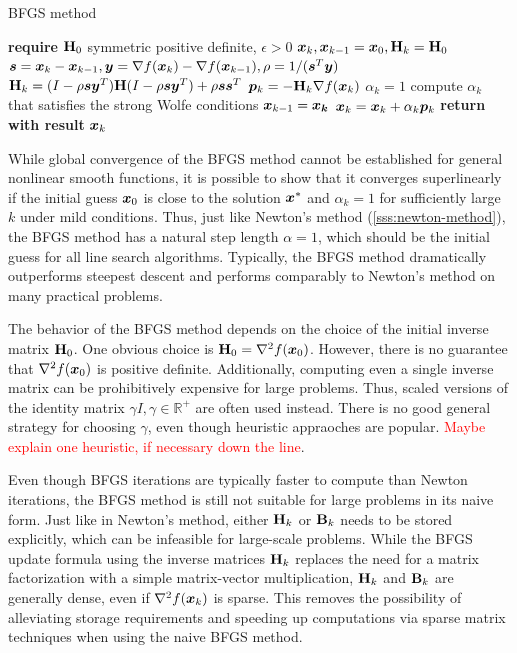 \begin{algorithm}
\caption{BFGS method}\label{alg:bfgs}
\begin{algorithmic}
\State \textbf{require } $\mathbf{H}_0$ symmetric positive definite, $\epsilon > 0$
\State $\bm{x}_k, \bm{x}_{k-1} = \bm{x}_0, \mathbf{H}_k = \mathbf{H}_0 $
\State $\bm{s} = \bm{x}_k - \bm{x}_{k-1}, \bm{y} = \nabla f(\bm{x}_k) - \nabla f(\bm{x}_{k-1}), \rho = 1 / (\bm{s}^T \bm{y})$
\State $\mathbf{H}_k = (I - \rho \bm{s} \bm{y}^T) \mathbf{H}(I - \rho \bm{s} \bm{y}^T) + \rho\bm{s}\bm{s}^T$
\State $\bm{p}_k = -\mathbf{H}_k \nabla f(\bm{x}_k)$
\State $\alpha_k = 1$
\State compute $\alpha_k$ that satisfies the strong Wolfe conditions
\EndIf
\State $\bm{x}_{k-1} = \bm{x_k}$
\State $\bm{x}_k = \bm{x}_k + \alpha_k \bm{p}_k$
\EndWhile
\State \textbf{return with result } $\bm{x}_k$
\EndProcedure
\end{algorithmic}
\end{algorithm}

While global convergence of the BFGS method cannot be established for general nonlinear smooth functions, it is possible to show that it converges 
superlinearly if the initial guess $\bm{x}_0$ is close to the solution $\bm{x}^*$ and $\alpha_k = 1$ for sufficiently large $k$ 
under mild conditions. Thus, just like Newton's method (\cref{sss:newton-method}), the BFGS method has a natural step length $\alpha=1$,
which should be the initial guess for all line search algorithms. Typically, the BFGS method dramatically outperforms steepest 
descent and performs comparably to Newton's method on many practical problems. 

The behavior of the BFGS method depends on the choice of the initial inverse matrix $\mathbf{H}_0$. One obvious choice is $\mathbf{H}_0 = \nabla^2 
f(\bm{x}_0)$. However, there is no guarantee that $\nabla^2 f(\bm{x}_0)$ is positive definite. Additionally, computing even a single inverse
matrix can be prohibitively expensive for large problems. Thus, scaled versions of the identity matrix $\gamma I, \gamma \in \mathbb{R}^+$ are
often used instead. There is no good general strategy for choosing $\gamma$, even though heuristic appraoches are popular. \textcolor{red}{Maybe
explain one heuristic, if necessary down the line}.

Even though BFGS iterations are typically faster to compute than Newton iterations, the BFGS method is still not suitable for large problems 
in its naive form. Just like in Newton's method, either $\mathbf{H}_k$ or $\mathbf{B}_k$ needs to be stored explicitly, which can be infeasible for 
large-scale problems. While the BFGS update formula using the inverse matrices $\mathbf{H}_k$ replaces the need for a matrix factorization with a simple 
matrix-vector multiplication, $\mathbf{H}_k$ and $\mathbf{B}_k$ are generally dense, even if $\nabla^2 f(\bm{x}_k)$ is sparse. This removes the possibility
of alleviating storage requirements and speeding up computations via sparse matrix techniques when using the naive BFGS method.

